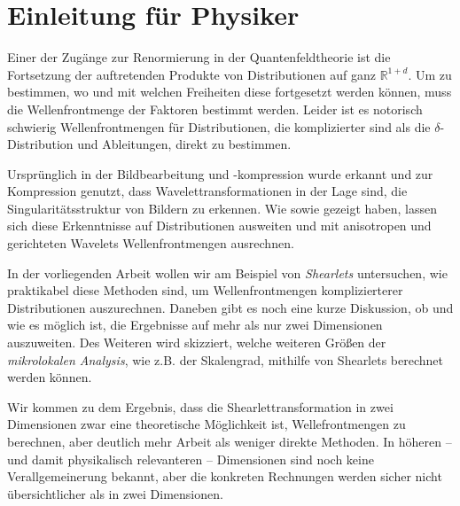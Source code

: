 
\chapter{Einleitung für Physiker} %
\label{sec:einleitung_physics}
Einer der Zugänge zur Renormierung in der Quantenfeldtheorie ist die Fortsetzung der auftretenden Produkte von Distributionen auf ganz $\mathbb{R}^{1+d}$. Um zu bestimmen, wo und mit welchen Freiheiten diese fortgesetzt werden können, muss die Wellenfrontmenge der Faktoren bestimmt werden. Leider ist es notorisch schwierig Wellenfrontmengen für Distributionen, die komplizierter sind als die $\delta$-Distribution und Ableitungen, direkt zu bestimmen.

Ursprünglich in der Bildbearbeitung und -kompression wurde erkannt und zur Kompression genutzt, dass Wavelettransformationen in der Lage sind, die Singularitätsstruktur von Bildern zu erkennen.
Wie \textcite {Kutyniok2008} sowie \textcite
{Candes2005} gezeigt haben, lassen sich diese Erkenntnisse auf Distributionen ausweiten und mit anisotropen und gerichteten Wavelets Wellenfrontmengen ausrechnen.

In der vorliegenden Arbeit wollen wir am Beispiel von \emph{Shearlets} untersuchen, wie praktikabel diese Methoden sind, um Wellenfrontmengen komplizierterer Distributionen auszurechnen. Daneben gibt es noch eine kurze Diskussion, ob und wie es möglich ist, die Ergebnisse auf mehr als nur zwei Dimensionen auszuweiten.
Des Weiteren wird skizziert, welche weiteren Größen der \emph{mikrolokalen Analysis}, wie z.B. der Skalengrad, mithilfe von Shearlets berechnet werden können.

Wir kommen zu dem Ergebnis, dass die Shearlettransformation in zwei Dimensionen zwar eine theoretische Möglichkeit ist, Wellefrontmengen zu berechnen, aber deutlich mehr Arbeit als weniger direkte Methoden. In höheren -- und damit physikalisch relevanteren -- Dimensionen sind noch keine Verallgemeinerung bekannt, aber die konkreten Rechnungen werden sicher nicht übersichtlicher als in zwei Dimensionen.


